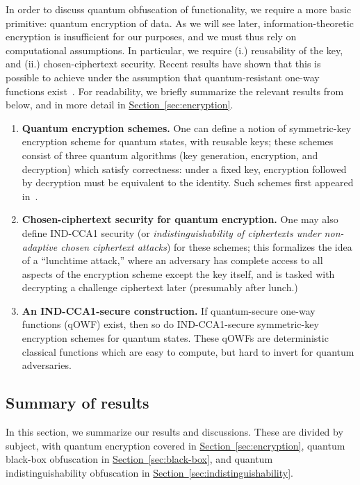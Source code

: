 \documentclass[11pt]{article}
\numberwithin{equation}{section}
\newcommand{\expref}[2]{\texorpdfstring{\hyperref[#2]{#1~\ref{#2}}}{#1~\ref{#2}}}
\begin{document}
{In order to discuss quantum obfuscation of functionality, we require a more basic primitive: quantum encryption of data. As we will see later, information-theoretic encryption is insufficient for our purposes, and we must thus rely on computational assumptions. In particular, we require (i.) reusability of the key, and (ii.) chosen-ciphertext security. Recent results have shown that this is possible to achieve under the assumption that quantum-resistant one-way functions exist~\cite{ABFGSS16}. For readability, we briefly summarize the relevant results from~\cite{ABFGSS16} below, and in more detail in \expref{Section}{sec:encryption}.
\begin{enumerate}
\item \textbf{Quantum encryption schemes.} One can define a notion of symmetric-key encryption scheme for quantum states, with reusable keys; these schemes consist of three quantum algorithms (key generation, encryption, and decryption) which satisfy correctness: under a fixed key, encryption followed by decryption must be equivalent to the identity. Such schemes first appeared in~\cite{BJ15}.
\item \textbf{Chosen-ciphertext security for quantum encryption.} One may also define IND-CCA1 security (or \emph{indistinguishability of ciphertexts under non-adaptive chosen ciphertext attacks}) for these schemes; this formalizes the idea of a ``lunchtime attack,'' where an adversary has complete access to all aspects of the encryption scheme except the key itself, and is tasked with decrypting a challenge ciphertext later (presumably after lunch.) 
\item \textbf{An IND-CCA1-secure construction.} If quantum-secure one-way functions (qOWF) exist, then so do IND-CCA1-secure symmetric-key encryption schemes for quantum states. These qOWFs are deterministic classical functions which are easy to compute, but hard to invert for quantum adversaries. 
\end{enumerate}

\subsection{Summary of results}

In this section, we summarize our results and discussions. These are divided by subject, with quantum encryption covered in \expref{Section}{sec:encryption}, quantum black-box obfuscation in \expref{Section}{sec:black-box}, and quantum indistinguishability obfuscation in \expref{Section}{sec:indistinguishability}.

}
\end{document}
